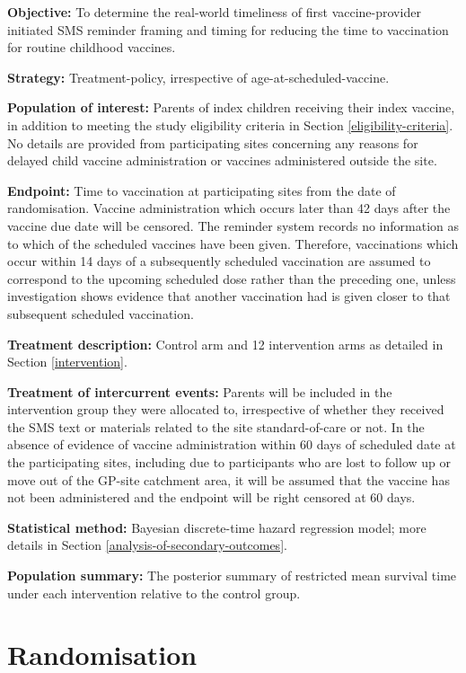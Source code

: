 \documentclass[
  bibliography=totoc]{scrreprt}
\begin{document}
\textbf{Objective:} To determine the real-world timeliness of first vaccine-provider initiated SMS reminder framing and timing for reducing the time to vaccination for routine childhood vaccines.

\textbf{Strategy:} Treatment-policy, irrespective of age-at-scheduled-vaccine.

\textbf{Population of interest:} Parents of index children receiving their index vaccine, in addition to meeting the study eligibility criteria in Section \ref{eligibility-criteria}.
No details are provided from participating sites concerning any reasons for delayed child vaccine administration or vaccines administered outside the site.

\textbf{Endpoint:} Time to vaccination at participating sites from the date of randomisation.
Vaccine administration which occurs later than 42 days after the vaccine due date will be censored.
The reminder system records no information as to which of the scheduled vaccines have been given.
Therefore, vaccinations which occur within 14 days of a subsequently scheduled vaccination are assumed to correspond to the upcoming scheduled dose rather than the preceding one, unless investigation shows evidence that another vaccination had is given closer to that subsequent scheduled vaccination.

\textbf{Treatment description:} Control arm and 12 intervention arms as detailed in Section \ref{intervention}.

\textbf{Treatment of intercurrent events:} Parents will be included in the intervention group they were allocated to, irrespective of whether they received the SMS text or materials related to the site standard-of-care or not.
In the absence of evidence of vaccine administration within 60 days of scheduled date at the participating sites, including due to participants who are lost to follow up or move out of the GP-site catchment area, it will be assumed that the vaccine has not been administered and the endpoint will be right censored at 60 days.

\textbf{Statistical method:} Bayesian discrete-time hazard regression model; more details in Section \ref{analysis-of-secondary-outcomes}.

\textbf{Population summary:} The posterior summary of restricted mean survival time under each intervention relative to the control group.

\hypertarget{randomisation}{%
\section{Randomisation}\label{randomisation}}
\end{document}
